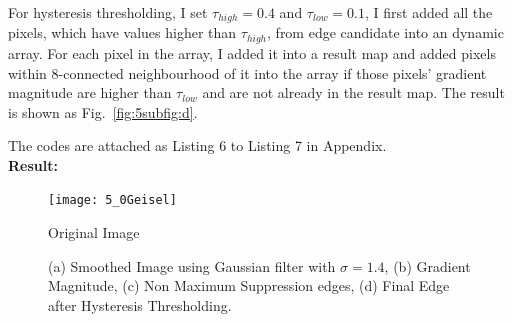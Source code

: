 \documentclass{assignment}
\begin{document}
\begin{problemlist}
For hysteresis thresholding, I set $\tau_{high} = 0.4$ and $\tau_{low} = 0.1$, I first added all the pixels, which have values higher than $\tau_{high}$, from edge candidate into an dynamic array. For each pixel in the array, I added it into a result map and added pixels within 8-connected neighbourhood of it into the array if those pixels' gradient magnitude are higher than $\tau_{low}$ and are not already in the result map. The result is shown as Fig.~\ref{fig:5subfig:d}.

The codes are attached as Listing 6 to Listing 7 in Appendix.\\

\textbf{Result:}

\begin{figure}[H]
\begin{center}
    \texttt{[image: 5\_0Geisel]}
    \caption{Original Image}
    \label{fig:5geisel}
\end{center}
\end{figure}

\begin{figure}[H]
    \begin{center}
        \hspace{0.5in}
        \label{fig:images}
        \vspace{0.5cm}
        \hspace{0.5in}
        \caption{(a) Smoothed Image using Gaussian filter with $\sigma = 1.4$, (b) Gradient Magnitude, (c) Non Maximum Suppression edges, (d) Final Edge after Hysteresis Thresholding.}
        \label{fig:5images}
    \end{center}
\end{figure}


\end{problemlist}
\end{document}
